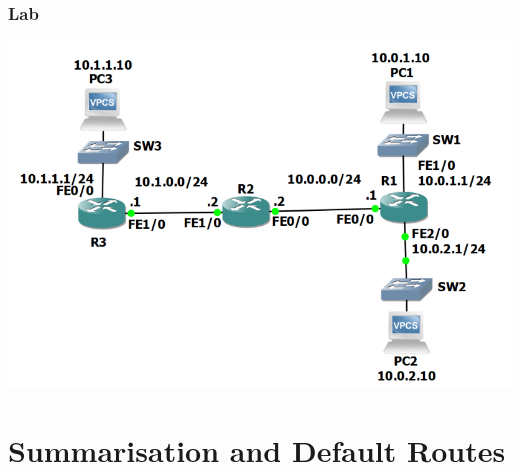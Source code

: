 \documentclass[pdflatex,compress,mathserif]{beamer}
\begin{document}
\begin{frame}
	\frametitle{Lab}
	\begin{center}
		\includegraphics[width=0.8\linewidth]{img/img05}
	\end{center}
\end{frame}

\section{Summarisation and Default Routes}
\end{document}
